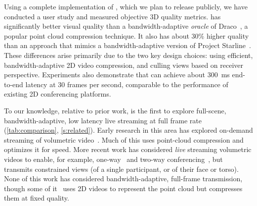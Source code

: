 Using a complete implementation of \sysname, which we plan to release publicly, we have conducted a user study and measured objective 3D quality metrics.
%
\sysname has significantly better visual quality than a bandwidth-adaptive \textit{oracle} of Draco~\cite{draco}, a popular point cloud compression technique.
%
It also has about 30\% higher quality than an approach that mimics a bandwidth-adaptive version of Project Starline~\cite{starline}.
%
These differences arise primarily due to the two key design choices: using efficient, bandwidth-adaptive 2D video compression, and culling views based on receiver perspective.
%
Experiments also demonstrate that \sysname can achieve about 300~ms end-to-end latency at 30 frames per second, comparable to the performance of existing 2D conferencing platforms. %

%
To our knowledge, relative to prior work, \sysname is the first to explore full-scene, bandwidth-adaptive, low latency live streaming at full frame rate (\cref{tab:comparison}, \cref{s:related}).
%
Early research in this area has explored on-demand streaming of volumetric video~\cite{groot,vivo}.
%
Much of this uses point-cloud compression and optimizes it for speed.
%
More recent work has considered \emph{live} streaming volumetric videos to enable, for example, one-way~\cite{metastream} and two-way conferencing~\cite{starline}, but transmits constrained views (of a single participant, or of their face or torso).
%
None of this work has considered bandwidth-adaptive, full-frame transmission, though some of it~\cite{starline} uses  2D videos to represent the point cloud but compresses them at fixed quality.


